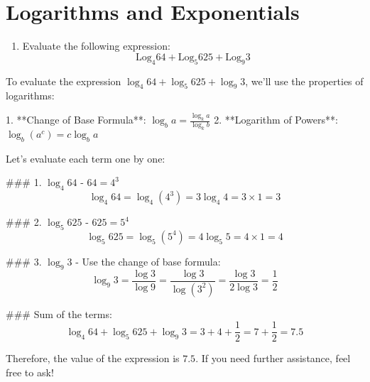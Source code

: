 
\section*{Logarithms and Exponentials}
\begin{enumerate}
    \item Evaluate the following expression:
\[ \mbox{Log}_4 64 + \mbox{Log}_5 625 + \mbox{Log}_9 3 \] 
\end{enumerate}

To evaluate the expression \( \log_4 64 + \log_5 625 + \log_9 3 \), we'll use the properties of logarithms:

1. **Change of Base Formula**: \(\log_b a = \frac{\log_k a}{\log_k b}\)
2. **Logarithm of Powers**: \(\log_b (a^c) = c \log_b a\)

Let's evaluate each term one by one:

### 1. \( \log_4 64 \)
- \(64 = 4^3\)
\[
\log_4 64 = \log_4 (4^3) = 3 \log_4 4 = 3 \times 1 = 3
\]

### 2. \( \log_5 625 \)
- \(625 = 5^4\)
\[
\log_5 625 = \log_5 (5^4) = 4 \log_5 5 = 4 \times 1 = 4
\]

### 3. \( \log_9 3 \)
- Use the change of base formula:
\[
\log_9 3 = \frac{\log 3}{\log 9} = \frac{\log 3}{\log (3^2)} = \frac{\log 3}{2 \log 3} = \frac{1}{2}
\]

### Sum of the terms:
\[
\log_4 64 + \log_5 625 + \log_9 3 = 3 + 4 + \frac{1}{2} = 7 + \frac{1}{2} = 7.5
\]

Therefore, the value of the expression is \(7.5\). If you need further assistance, feel free to ask!